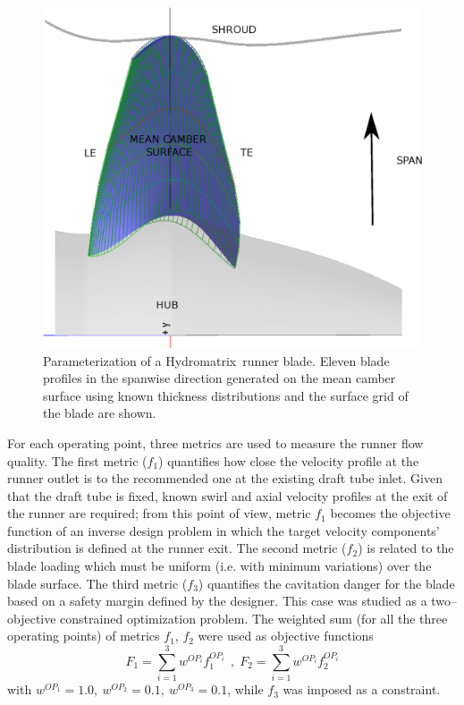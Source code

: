 \documentclass{vki_ls}
\begin{document}
\begin{figure}[!ht]
    \centering
    \includegraphics[angle=0, scale=0.4]{maeas/MatrixParam.eps}
    \caption{Parameterization of a Hydromatrix\textregistered~runner blade.
             Eleven blade profiles in the spanwise direction generated on
	     the mean camber surface using known thickness distributions 
	     and the surface grid of the blade are shown.}
    \label{f:MatParam}
\end{figure}

For each operating point, three metrics are used to measure the runner flow quality. The first metric ($f_1$) quantifies how close the velocity profile at the runner outlet is to the recommended one at the existing draft tube inlet. Given that the draft tube is fixed, known swirl and axial velocity profiles at the exit of the runner are required; from this point of view, metric $f_1$ becomes the objective function of an inverse design problem in which the target velocity components' distribution is defined at the runner exit. The second metric ($f_2$) is related to the blade loading which must be uniform (i.e. with minimum variations) over the blade surface. The third metric ($f_3$) quantifies the cavitation danger for the blade based on a safety margin defined by the designer. 
This case was studied as a two--objective constrained optimization problem. The weighted sum (for all the three operating points) of metrics $f_1$, $f_2$ were used as objective functions
\begin{equation}
	F_1 = \sum_{i=1}^3 w^{OP_i} f_1^{OP_i} ~~\mbox{,}~~ 
	F_2 = \sum_{i=1}^3 w^{OP_i} f_2^{OP_i}
        \nonumber
\end{equation}
with $w^{OP_1}=1.0,~ w^{OP_2}=0.1,~ w^{OP_3}=0.1$, while $f_3$ was imposed as a constraint.
\end{document}
